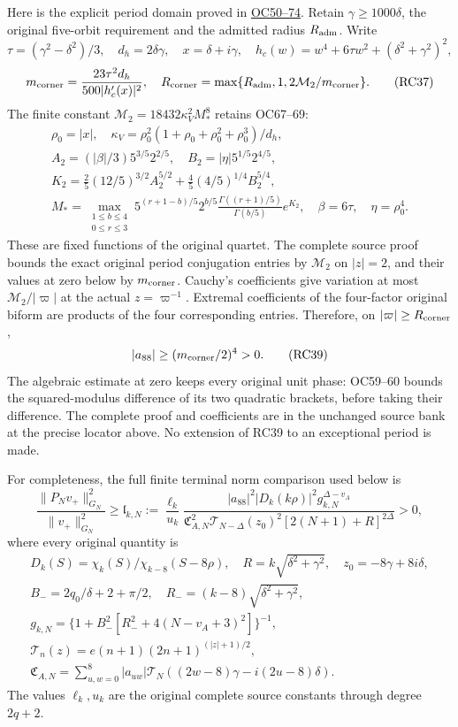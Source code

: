 \documentclass[10pt]{article}
\begin{document}
Here is the explicit period domain proved in \href{https://github.com/KokunoYumeto/zeta-function-research-reader/blob/6cf5b3aa8ff395eba6b5512b28d117334da5767b/workbenches/splitzero-tandem/continuations/20260922-cutoff-profile/RETAINED_COMPLETE_PROOF_SOURCES.tex\#L127917}{OC50--74}. Retain \(\gamma\ge1000\delta\), the original five-orbit requirement and the admitted radius \(R_{\rm adm}\). Write \[
\tau=(\gamma^2-\delta^2)/3,\quad d_h=2\delta\gamma,\quad
x=\delta+i\gamma,\quad h_c(w)=w^4+6\tau w^2+(\delta^2+\gamma^2)^2,
\] \[
m_{\rm corner}=\frac{23\tau^2d_h}{500|h_c'(x)|^2},
\quad
R_{\rm corner}=\max\{R_{\rm adm},1,2\mathcal M_2/m_{\rm corner}\}.
\tag{RC37}
\] The finite constant \(\mathcal M_2=18432\kappa_V^2 M_*^8\) retains OC67--69: \[
\begin{gathered}
\rho_0=|x|,\quad
\kappa_V=\rho_0^2(1+\rho_0+\rho_0^2+\rho_0^3)/d_h,\\
A_2=(|\beta|/3)5^{3/5}2^{2/5},\quad
B_2=|\eta|5^{1/5}2^{4/5},\\
K_2=\tfrac25(12/5)^{3/2}A_2^{5/2}
+\tfrac45(4/5)^{1/4}B_2^{5/4},\\
M_*=\max_{\substack{1\le b\le4\\0\le r\le3}}
5^{(r+1-b)/5}2^{b/5}
\frac{\Gamma((r+1)/5)}{\Gamma(b/5)}e^{K_2},
\quad \beta=6\tau,\quad\eta=\rho_0^4.
\end{gathered}
\tag{RC38}
\] These are fixed functions of the original quartet. The complete source proof bounds the exact original period conjugation entries by \(\mathcal M_2\) on \(|z|=2\), and their values at zero below by \(m_{\rm corner}\). Cauchy's coefficients give variation at most \(\mathcal M_2/|\varpi|\) at the actual \(z=\varpi^{-1}\). Extremal coefficients of the four-factor original biform are products of the four corresponding entries. Therefore, on \(|\varpi|\ge R_{\rm corner}\), \[
|a_{88}|\ge(m_{\rm corner}/2)^4>0.
\tag{RC39}
\] The algebraic estimate at zero keeps every original unit phase: OC59--60 bounds the squared-modulus difference of its two quadratic brackets, before taking their difference. The complete proof and coefficients are in the unchanged source bank at the precise locator above. No extension of RC39 to an exceptional period is made.

For completeness, the full finite terminal norm comparison used below is \[
\frac{\|P_Nv_+\|_{G_N}^2}{\|v_+\|_{G_N}^2}
\ge\mathfrak l_{k,N}:=
\frac{\ell_k}{u_k}
\frac{|a_{88}|^2|D_k(k\rho)|^2g_{k,N}^{\Delta-v_A}}
{\mathfrak C_{A,N}^2\mathcal T_{N-\Delta}(z_0)^2
[2(N+1)+R]^{2\Delta}}>0,
\tag{RC40}
\] where every original quantity is \[
\begin{gathered}
D_k(S)=\chi_k(S)/\chi_{k-8}(S-8\rho),\quad
R=k\sqrt{\delta^2+\gamma^2},\quad z_0=-8\gamma+8i\delta,\\
B_-=2q_0/\delta+2+\pi/2,\quad
R_-=(k-8)\sqrt{\delta^2+\gamma^2},\\
g_{k,N}=\{1+B_-^2[R_-^2+4(N-v_A+3)^2]\}^{-1},\\
\mathcal T_n(z)=e(n+1)(2n+1)^{(|z|+1)/2},\\
\mathfrak C_{A,N}=\sum_{u,w=0}^8|a_{uw}|
\mathcal T_N((2w-8)\gamma-i(2u-8)\delta).
\end{gathered}
\tag{RC41}
\] The values \(\ell_k,u_k\) are the original complete source constants through degree \(2q+2\).
\end{document}
